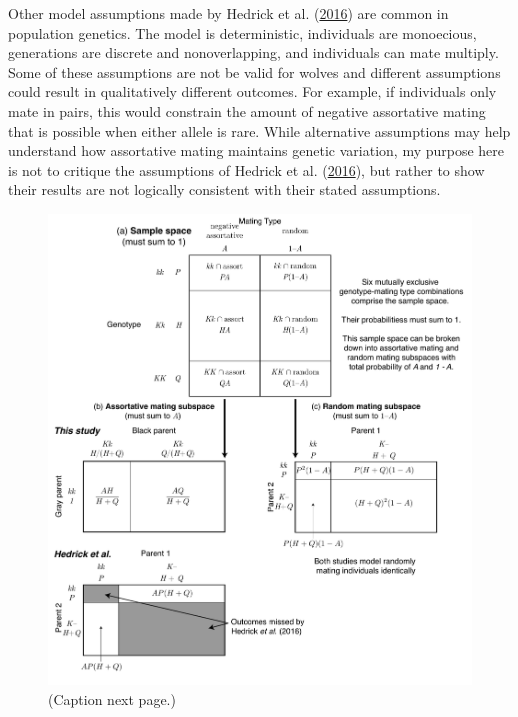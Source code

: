\documentclass[
]{article}
\begin{document}
Other model assumptions made by Hedrick et al. (\protect\hyperlink{ref-hedrick_negative-assortative_2016}{2016}) are common in population genetics. The model is deterministic, individuals are monoecious, generations are discrete and nonoverlapping, and individuals can mate multiply. Some of these assumptions are not be valid for wolves and different assumptions could result in qualitatively different outcomes. For example, if individuals only mate in pairs, this would constrain the amount of negative assortative mating that is possible when either allele is rare. While alternative assumptions may help understand how assortative mating maintains genetic variation, my purpose here is not to critique the assumptions of Hedrick et al. (\protect\hyperlink{ref-hedrick_negative-assortative_2016}{2016}), but rather to show their results are not logically consistent with their stated assumptions.

\begin{figure}[ht]
  \centering
  \includegraphics[width=\textwidth]{../figures/sample-space.pdf}
  \caption{(Caption next page.)}
  \label{fig:sample-space}
\end{figure}
\addtocounter{figure}{-1}
\end{document}
